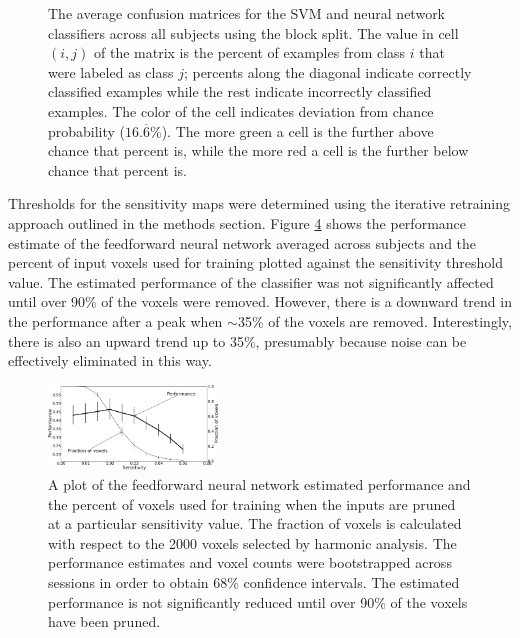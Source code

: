 \documentclass[preprint,5p,authoryear]{elsarticle}
\begin{document}
\begin{figure}
\centering
\begin{subfigure}{0.3\textwidth}
\centering
\begin{adjustbox}{center}

\end{adjustbox}
\caption{}
\label{fig:average-confusion-svm}
\end{subfigure}
\begin{subfigure}{0.3\textwidth}
\centering
\begin{adjustbox}{center}

\end{adjustbox}
\caption{}
\label{fig:average-confusion-nn}
\end{subfigure}
\caption{The average confusion matrices for the  SVM and  neural network classifiers across all subjects using the block split.
The value in cell $(i,j)$ of the matrix is the percent of examples from class $i$ that were labeled as class $j$; percents along the diagonal indicate correctly classified examples while the rest indicate incorrectly classified examples.
The color of the cell indicates deviation from chance probability ($16.\overline{6}$\%).
The more green a cell is the further above chance that percent is, while the more red a cell is the further below chance that percent is.}
\label{fig:average-confusion}
\end{figure}

Thresholds for the sensitivity maps were determined using the iterative retraining approach outlined in the methods section.
Figure \ref{fig:sensitivity-cutoff} shows the performance estimate of the feedforward neural network averaged across subjects and the percent of input voxels used for training plotted against the sensitivity threshold value.
The estimated performance of the classifier was not significantly affected until over 90\% of the voxels were removed.
However, there is a downward trend in the performance after a peak when $\sim$35\% of the voxels are removed.
Interestingly, there is also an upward trend up to 35\%, presumably because noise can be effectively eliminated in this way.

\begin{figure}
\centering
\includegraphics[width=0.4\textwidth]{figures/performance-verse-sensitivity-cutoff}
\caption{A plot of the feedforward neural network estimated performance and the percent of voxels used for training when the inputs are pruned at a particular sensitivity value.
The fraction of voxels is calculated with respect to the 2000 voxels selected by harmonic analysis.
The performance estimates and voxel counts were bootstrapped across sessions in order to obtain 68\% confidence intervals.
The estimated performance is not significantly reduced until over 90\% of the voxels have been pruned.}
\label{fig:sensitivity-cutoff}
\end{figure}
\end{document}
